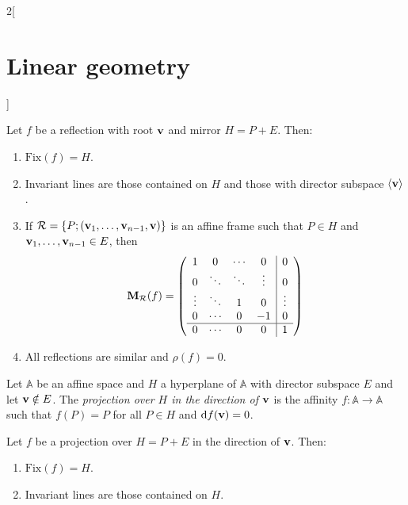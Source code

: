 \documentclass[../../../main.tex]{subfiles}
\begin{document}
\begin{multicols}{2}[\section{Linear geometry}]
\begin{definition}[Reflections]
    \end{definition}
    \begin{prop}
        Let $f$ be a reflection with root $\vb{v}$ and mirror $H=P+E$. Then:
        \begin{enumerate}
            \item $\text{Fix}(f)=H$.
            \item Invariant lines are those contained on $H$ and those with director subspace $\langle\vb{v}\rangle$.
            \item If $\mathcal{R}=\{P;(\vb{v}_1,\ldots,\vb{v}_{n-1},\vb{v})\}$ is  an affine frame such that $P\in H$ and $\vb{v}_1,\ldots,\vb{v}_{n-1}\in E$, then $$\vb{M}_\mathcal{R}(f)=\left(\begin{array}{cccc|c}
                              1      & 0      & \cdots & 0      & 0      \\
                              0      & \ddots & \ddots & \vdots & 0      \\
                              \vdots & \ddots & 1      & 0      & \vdots \\
                              0      & \cdots & 0      & -1     & 0      \\
                              \hline
                              0      & \cdots & 0      & 0      & 1      \\
                          \end{array}\right)$$
            \item All reflections are similar and $\rho(f)=0$.
        \end{enumerate}
    \end{prop}
    \begin{definition}[Projections]
        Let $\mathbb{A}$ be an affine space and $H$ a hyperplane of $\mathbb{A}$ with director subspace $E$ and let $\vb{v}\notin E$. The \textit{projection over $H$ in the direction of $\vb{v}$} is the affinity $f:\mathbb{A}\rightarrow\mathbb{A}$ such that $f(P)=P$ for all $P\in H$ and $\dd f(\vb{v})=0$.
    \end{definition}
    \begin{prop}
        Let $f$ be a projection over $H=P+E$ in the direction of $\vb{v}$. Then:
        \begin{enumerate}
            \item $\text{Fix}(f)=H$.
            \item Invariant lines are those contained on $H$.

\end{enumerate}
\end{prop}
\end{multicols}
\end{document}
